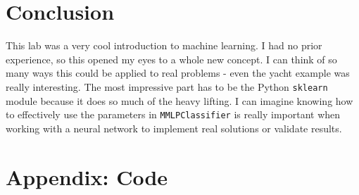 \documentclass[11pt,a4paper]{article}
\begin{document}
\section{Conclusion}
This lab was a very cool introduction to machine learning. I had no prior experience, so this opened my eyes to a whole new concept. I can think of so many ways this could be applied to real problems - even the yacht example was really interesting. The most impressive part has to be the Python \verb|sklearn| module because it does so much of the heavy lifting. I can imagine knowing how to effectively use the parameters in \verb|MMLPClassifier| is really important when working with a neural network to implement real solutions or validate results.

\clearpage

\section{Appendix: Code}
\end{document}
